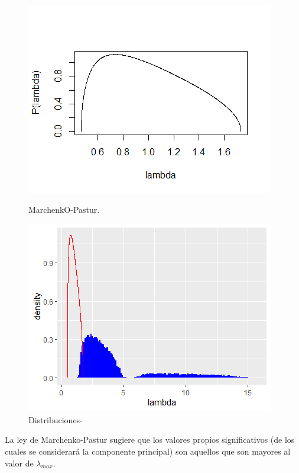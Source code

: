 \documentclass[paper=letter, fontsize=14pt]{scrartcl}
\numberwithin{equation}{section} %
\numberwithin{figure}{section} %
\numberwithin{table}{section} %
\begin{document}
\begin{figure}[h]
  \centering
  \begin{minipage}[b]{0.4\textwidth}
    \includegraphics[width=\textwidth]{i4.png}
    \caption{MarchenkO-Pastur.}
  \end{minipage}
  \hfill
  \begin{minipage}[b]{0.4\textwidth}
    \includegraphics[width=\textwidth]{i5.png}
    \caption{Distribuciones-}
  \end{minipage}
\end{figure}

La ley de Marchenko-Pastur sugiere que los valores propios significativos (de los cuales se considerará la componente principal) son aquellos que son mayores al valor de $\lambda_{max}$.\\
\end{document}
